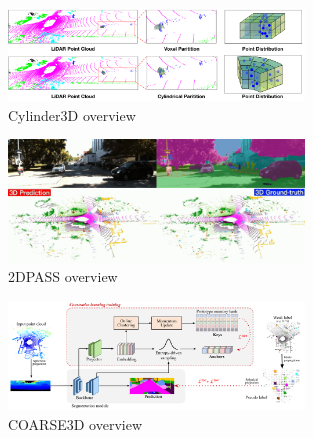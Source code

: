 \begin{figure}[htp]
  \centering
  \includegraphics[width=0.7\textwidth]{images/cylinder3d_overview.png}
  \caption{Cylinder3D overview}
  \label{fig:cylinder3d-overview}
\end{figure}

\begin{figure}[htp]
  \centering
  \includegraphics[width=0.7\textwidth]{images/2DPASS_overview.png}
  \caption{2DPASS overview}
  \label{fig:2dpass-overview}
\end{figure}

\begin{figure}[htp]
  \centering
  \includegraphics[width=0.7\textwidth]{images/coarse3d_overview.png}
  \caption{COARSE3D overview}
  \label{fig:coarse3d-overview}
\end{figure}

